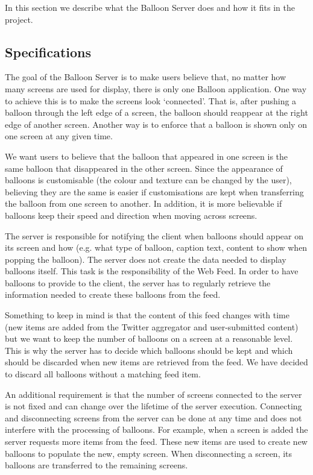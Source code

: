 In this section we describe what the Balloon Server does and how it fits in the
project. 

\subsection{Specifications}

The goal of the Balloon Server is to make users believe that, no matter how
many screens are used for display, there is only one Balloon application. One
way to achieve this is to make the screens look `connected'. That is, after
pushing a balloon through the left edge of a screen, the balloon should
reappear at the right edge of another screen. Another way is to enforce that a
balloon is shown only on one screen at any given time.

We want users to believe that the balloon that appeared in one screen is the
same balloon that disappeared in the other screen. Since the appearance of
balloons is customisable (the colour and texture can be changed by the user),
believing they are the same is easier if customisations are kept when
transferring the balloon from one screen to another. In addition, it is more
believable if balloons keep their speed and direction when moving across 
screens.

The server is responsible for notifying the client when balloons should appear
on its screen and how (e.g. what type of balloon, caption text, content
to show when popping the balloon). The server does not create the data needed to
display balloons itself. This task is the responsibility of the Web Feed. In
order to have balloons to provide to the client, the server has to regularly
retrieve the information needed to create these balloons from the feed.

Something to keep in mind is that the content of this feed changes with time
(new items are added from the Twitter aggregator and user-submitted 
content) but we want to keep the number of balloons on a screen at a
reasonable level. This is why the server has to decide which balloons should be
kept and which should be discarded when new items are retrieved from the feed.
We have decided to discard all balloons without a matching feed item.

An additional requirement is that the number of screens connected to the server
is not fixed and can change over the lifetime of the server execution. 
Connecting and disconnecting screens from the server can be done at
any time and does not interfere with the processing of balloons. For example, 
when a screen is added the server requests more items from the feed. These new
items are used to create new balloons to populate the new, empty screen. When 
disconnecting a screen, its balloons are transferred to the remaining screens.

